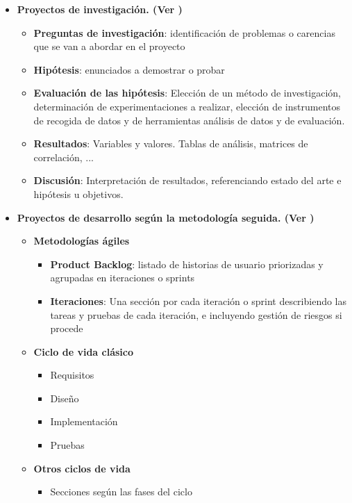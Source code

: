 \begin{itemize}
    \item \textbf{Proyectos de investigación. (Ver )}
    \begin{itemize}
                \item \textbf{Preguntas de investigación}: identificación de problemas o carencias que se van a abordar en el proyecto 
                \item \textbf{Hipótesis}: enunciados a demostrar o probar
                \item \textbf{Evaluación de las hipótesis}: Elección de un método de investigación, determinación de experimentaciones a realizar, elección de instrumentos de recogida de datos y de herramientas análisis de datos y de evaluación.
                \item \textbf{Resultados}: Variables y valores. Tablas de análisis, matrices de correlación, ...
                \item \textbf{Discusión}: Interpretación de resultados, referenciando estado del arte e hipótesis u objetivos.
    \end{itemize}
    
    \item \textbf{Proyectos de desarrollo según la metodología seguida. (Ver )}
        \begin{itemize}
            \item \textbf{Metodologías ágiles}
                \begin{itemize}
                    \item \textbf{Product Backlog}: listado de historias de usuario priorizadas y agrupadas en iteraciones o sprints
                    \item \textbf{Iteraciones}: Una sección por cada iteración o sprint describiendo las tareas y pruebas de cada iteración, e incluyendo gestión de riesgos si procede
                \end{itemize}
            \item \textbf{Ciclo de vida clásico}
                \begin{itemize}
                    \item Requisitos
                    \item Diseño
                    \item Implementación
                    \item Pruebas
                \end{itemize}
            \item \textbf{Otros ciclos de vida}
                \begin{itemize}
                    \item Secciones según las fases del ciclo
                \end{itemize}
        \end{itemize}
        

\end{itemize}
